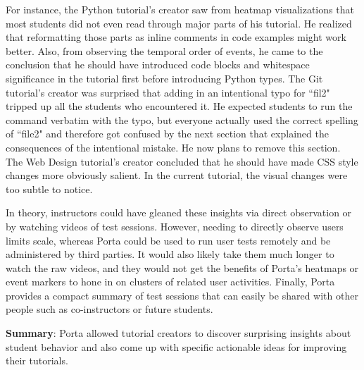 For instance, the Python tutorial's creator saw from heatmap
visualizations that most students did not even read through major parts
of his tutorial. He realized that reformatting those parts as inline
comments in code examples might work better. Also, from observing the
temporal order of events, he came to the conclusion that he should have
introduced code blocks and whitespace significance in the tutorial first
before introducing Python types.
%
The Git tutorial's creator was surprised that adding in an intentional
typo for ``fil2" tripped up all the students who encountered it. He
expected students to run the command verbatim with the typo, but
everyone actually used the correct spelling of ``file2" and therefore
got confused by the next section that explained the consequences of the
intentional mistake. He now plans to remove this section.
%
The Web Design tutorial's creator concluded that he should have made CSS
style changes more obviously salient. In the current tutorial, the
visual changes were too subtle to notice.





In theory, instructors could have gleaned these insights via direct
observation or by watching videos of test sessions. However, needing to
directly observe users limits scale, whereas Porta could be used to run
user tests remotely and be administered by third parties. It would also
likely take them much longer to watch the raw videos, and they would not
get the benefits of Porta's heatmaps or event markers to hone in on
clusters of related user activities. Finally, Porta provides a compact
summary of test sessions that can easily be shared with other people
such as co-instructors or future students.

\begin{mynote}

\textbf{Summary}: Porta allowed tutorial creators to discover surprising
insights about student behavior and also come up with specific
actionable ideas for improving their tutorials.

\end{mynote}
